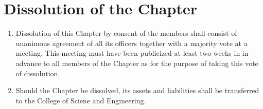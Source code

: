 \documentclass[12pt,letterpaper]{article}
\begin{document}
\section{Dissolution of the Chapter}
\begin{enumerate}
	\item Dissolution of this Chapter by consent of the members shall consist of
				unanimous agreement of all its officers together with a majority vote at a
				meeting. This meeting must have been publicized at least two weeks in in
				advance to all members of the Chapter as for the purpose of taking this vote
				of dissolution.
	\item Should the Chapter be dissolved, its assets and liabilities shall be
				transferred to the College of Sciene and Engineering.

\end{enumerate}
\end{document}
